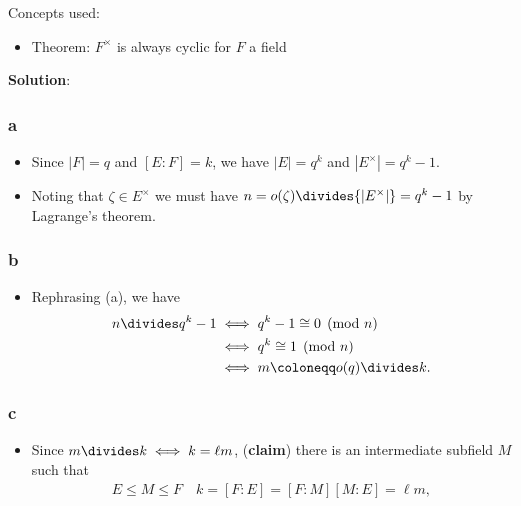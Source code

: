 \begin{solution}

Concepts used:

\begin{itemize}
\tightlist
\item
  Theorem: \(F^{\times}\) is always cyclic for \(F\) a field
\end{itemize}

\textbf{Solution}:

\hypertarget{a-52}{%
\subsubsection{a}\label{a-52}}

\begin{itemize}
\item
  Since \({\left\lvert {F} \right\rvert} = q\) and \([E:F] = k\), we
  have \({\left\lvert {E} \right\rvert} = q^k\) and
  \({\left\lvert {E^{\times}} \right\rvert} = q^k-1\).
\item
  Noting that \(\zeta \in E^{\times}\) we must have
  \(n = o(\zeta) \divides {\left\lvert {E^{\times}} \right\rvert} = q^k-1\)
  by Lagrange's theorem.
\end{itemize}

\hypertarget{b-42}{%
\subsubsection{b}\label{b-42}}

\begin{itemize}
\tightlist
\item
  Rephrasing (a), we have
  \begin{align*}
  n \divides q^k-1 
  &\iff q^k-1 \cong 0 \pmod n \\
  &\iff q^k \cong 1 \pmod n \\
  &\iff m \coloneqq o(q) \divides k
  .\end{align*}
\end{itemize}

\hypertarget{c-28}{%
\subsubsection{c}\label{c-28}}

\begin{itemize}
\item
  Since \(m\divides k \iff k = \ell m\), (\textbf{claim}) there is an
  intermediate subfield \(M\) such that
  \begin{align*}
  E \leq M \leq F \quad k = [F:E] = [F:M] [M:E] = \ell m
  ,\end{align*}


\end{itemize}
\end{solution}

